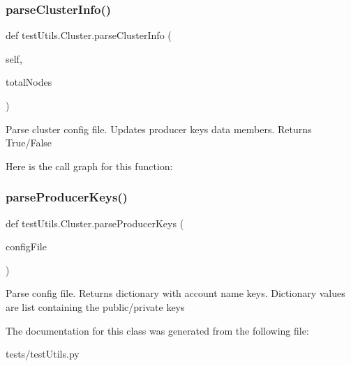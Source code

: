 \subsubsection{\texorpdfstring{parse\+Cluster\+Info()}{parseClusterInfo()}}
{\footnotesize\ttfamily def test\+Utils.\+Cluster.\+parse\+Cluster\+Info (\begin{DoxyParamCaption}\item[{}]{self,  }\item[{}]{total\+Nodes }\end{DoxyParamCaption})}

\begin{DoxyVerb}Parse cluster config file. Updates producer keys data members. Returns True/False\end{DoxyVerb}
 Here is the call graph for this function\+:
\mbox{\label{classtest_utils_1_1_cluster_aa5a139808432b328d896efe8feb86e82}} 
\subsubsection{\texorpdfstring{parse\+Producer\+Keys()}{parseProducerKeys()}}
{\footnotesize\ttfamily def test\+Utils.\+Cluster.\+parse\+Producer\+Keys (\begin{DoxyParamCaption}\item[{}]{config\+File }\end{DoxyParamCaption})\hspace{0.3cm}{\ttfamily [static]}}

\begin{DoxyVerb}Parse config file. Returns dictionary with account name keys. Dictionary values are list containing the public/private keys\end{DoxyVerb}
 

The documentation for this class was generated from the following file\+:\begin{DoxyCompactItemize}
\item 
tests/test\+Utils.\+py\end{DoxyCompactItemize}
